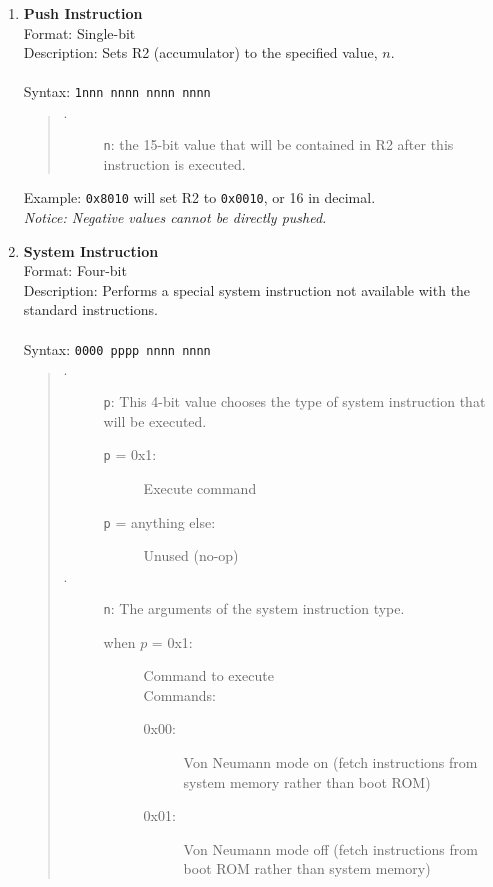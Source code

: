 \documentclass{article}
\begin{document}
			\begin{enumerate}
				
				\item \textbf{Push Instruction}\\
				Format: Single-bit\\
				Description: Sets R2 (accumulator) to the specified value, $n$.\\
				\\
				Syntax: \texttt{1nnn nnnn nnnn nnnn}
				\begin{quote}
					\begin{description}
						\item[$\cdot$] \texttt{n}: the 15-bit value that will be contained in R2 after this instruction is executed.
					\end{description}
				\end{quote}
				Example: \texttt{0x8010} will set R2 to \texttt{0x0010}, or 16 in decimal.\\
				\emph{Notice: Negative values cannot be directly pushed.}
				\\
			
				\item \textbf{System Instruction}\\
				Format: Four-bit\\
				Description: Performs a special system instruction not available with the standard instructions.\\
				\\
				Syntax: \texttt{0000 pppp nnnn nnnn}
				\begin{quote}
					\begin{description}
						\item[$\cdot$] \texttt{p}: This 4-bit value chooses the type of system instruction that will be executed.
						\begin{description}
							\item[\texttt{p} = 0x1:] Execute command
							\item[\texttt{p} = anything else:] Unused (no-op)
						\end{description}
						\item[$\cdot$] \texttt{n}: The arguments of the system instruction type.
						\begin{description}
							\item[when $p$ = 0x1:] Command to execute\\
							Commands:
							\begin{description}
								\item[0x00:] Von Neumann mode on (fetch instructions from system memory rather than boot ROM)
								\item[0x01:] Von Neumann mode off (fetch instructions from boot ROM rather than system memory)
							\end{description}
						

\end{description}
\end{description}
\end{quote}
\end{enumerate}
\end{document}
